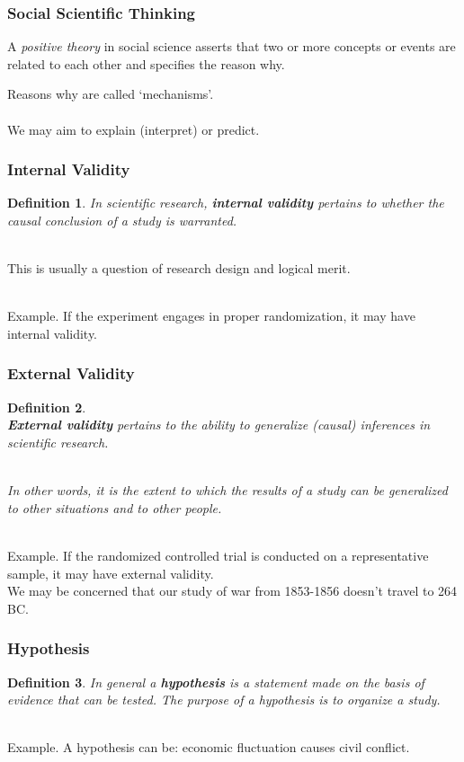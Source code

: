 \documentclass[aspectratio=169, handout]{beamer}
\newtheorem{defn}{Definition}
\numberwithin{equation}{section}
\begin{document}
\begin{frame}
\frametitle{Social Scientific Thinking}
A \emph{positive theory} in social science asserts that two or more concepts or events are related to each other and specifies the reason why.  

Reasons why are called `mechanisms'.\\

\ \\We may aim to explain (interpret) or predict. 
\end{frame}



\begin{frame}
\frametitle{Internal Validity}

\begin{defn}
In scientific research, \textbf{internal validity} pertains to whether the causal conclusion of a study is warranted.  
\end{defn} \pause

\ \\This is usually a question of research design and logical merit.

\ \\Example. If the experiment engages in proper randomization, it may have internal validity. 
\end{frame}



\begin{frame}
\frametitle{External Validity}

\begin{defn}
\  \\\textbf{External validity} pertains to the ability to generalize (causal) inferences in scientific research.


\ \\ In other words, it is the extent to which the results of a study can be generalized to other situations and to other people.
\end{defn} \pause

\ \\Example. If the randomized controlled trial is conducted on a representative sample, it may have external validity.\\ We may be concerned that our study of war from 1853-1856 doesn't travel to 264 BC.

\end{frame}



\begin{frame}
\frametitle{Hypothesis}

\begin{defn}
In general a \textbf{hypothesis} is a statement made on the basis of evidence that can be tested. The purpose of a hypothesis is to organize a study.
\end{defn} \pause

\ \\Example. A hypothesis can be: economic fluctuation causes civil conflict. 

\end{frame}
\end{document}
